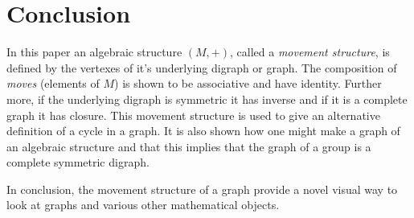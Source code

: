 \documentclass[a4paper,11pt]{article}
\theoremstyle{plain}
\theoremstyle{definition}
\begin{document}
\section{Conclusion}
In this paper an algebraic structure $(M,+)$, called a \textit{movement
structure}, is defined by the vertexes of it's underlying digraph or
graph. The composition of \textit{moves} (elements of $M$) is shown
to be associative and have identity. Further more, if the underlying
digraph is symmetric it has inverse and if it is a complete graph it has
closure. This movement structure is used to give an alternative definition
of a cycle in a graph. It is also shown how one might make a graph of
an algebraic structure and that this implies that the graph of a group
is a complete symmetric digraph. 

In conclusion, the movement structure of a graph provide a novel visual
way to look at graphs and various other mathematical objects.
\end{document}
